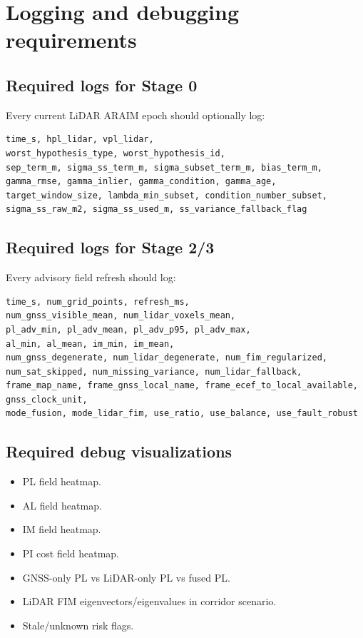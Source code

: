 \documentclass[11pt,a4paper]{article}
\begin{document}
\section{Logging and debugging requirements}

\subsection{Required logs for Stage 0}

Every current LiDAR ARAIM epoch should optionally log:
\begin{lstlisting}
time_s, hpl_lidar, vpl_lidar,
worst_hypothesis_type, worst_hypothesis_id,
sep_term_m, sigma_ss_term_m, sigma_subset_term_m, bias_term_m,
gamma_rmse, gamma_inlier, gamma_condition, gamma_age,
target_window_size, lambda_min_subset, condition_number_subset,
sigma_ss_raw_m2, sigma_ss_used_m, ss_variance_fallback_flag
\end{lstlisting}

\subsection{Required logs for Stage 2/3}

Every advisory field refresh should log:
\begin{lstlisting}
time_s, num_grid_points, refresh_ms,
num_gnss_visible_mean, num_lidar_voxels_mean,
pl_adv_min, pl_adv_mean, pl_adv_p95, pl_adv_max,
al_min, al_mean, im_min, im_mean,
num_gnss_degenerate, num_lidar_degenerate, num_fim_regularized,
num_sat_skipped, num_missing_variance, num_lidar_fallback,
frame_map_name, frame_gnss_local_name, frame_ecef_to_local_available, gnss_clock_unit,
mode_fusion, mode_lidar_fim, use_ratio, use_balance, use_fault_robust
\end{lstlisting}

\subsection{Required debug visualizations}

\begin{itemize}
\item PL field heatmap.
\item AL field heatmap.
\item IM field heatmap.
\item PI cost field heatmap.
\item GNSS-only PL vs LiDAR-only PL vs fused PL.
\item LiDAR FIM eigenvectors/eigenvalues in corridor scenario.
\item Stale/unknown risk flags.
\end{itemize}
\end{document}
